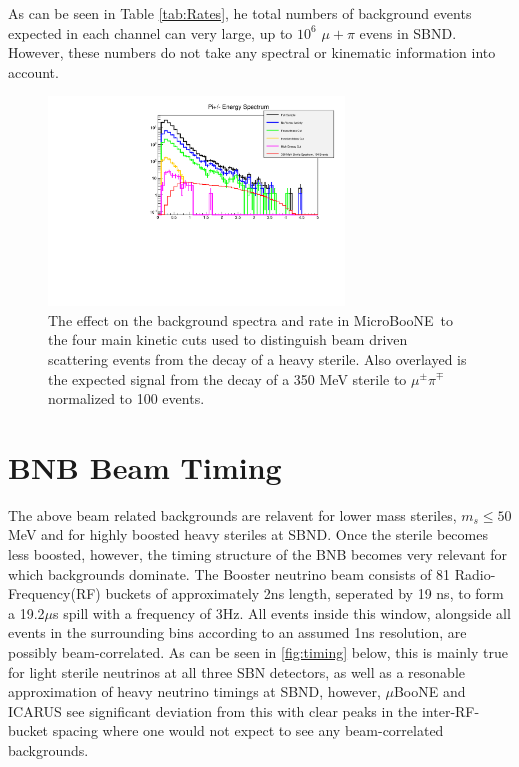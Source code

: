 \documentclass[11pt, a4paper]{article}
\def\muboone{MicroBooNE}
\begin{document}
As can be seen in Table \ref{tab:Rates}, he total numbers of background events expected in each channel can very large, up to $10^6$ $\mu+\pi$ evens in SBND. However, these numbers do not take any spectral or kinematic information into account. 
\begin{figure}[t]
\center
\includegraphics[width=0.7\textwidth]{figures/cuts.pdf}
\caption{\label{fig:cuts} The effect on the background spectra and rate in \muboone\ to the four main kinetic cuts used to distinguish beam driven scattering events from the decay of a heavy sterile. Also overlayed is the expected signal from the decay of a 350 MeV sterile to $\mu^\pm \pi^\mp$ normalized to 100 events.}
\end{figure}




\section{BNB Beam Timing}
The above beam related backgrounds are relavent for lower mass steriles, $m_s \leq 50$ MeV and for highly boosted heavy steriles at SBND. Once the sterile becomes less boosted, however, the timing structure of the BNB becomes very relevant for which backgrounds dominate. The Booster neutrino beam consists of 81 Radio-Frequency(RF) buckets of approximately 2ns length, seperated by 19 ns, to form a 19.2$\mu$s spill with a frequency of 3Hz. All events inside this window, alongside all events in the surrounding bins according to an assumed 1ns resolution, are possibly beam-correlated. As can be seen in \ref{fig:timing} below, this is mainly true for light sterile neutrinos at all three SBN detectors, as well as a resonable approximation of heavy neutrino timings at SBND, however, $\mu$BooNE and ICARUS see significant deviation from this with clear peaks in the inter-RF-bucket spacing where one would not expect to see any beam-correlated backgrounds. \\
\end{document}
